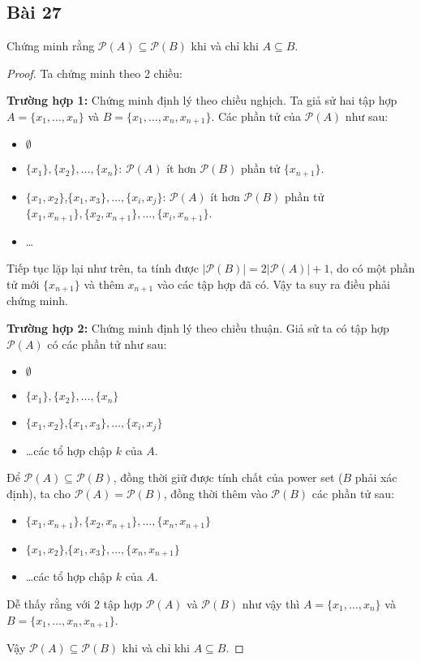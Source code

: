 \subsection*{Bài 27}
Chứng minh rằng $\mathcal{P}(A)\subseteq\mathcal{P}(B)$ khi và chỉ khi $A\subseteq B$.
\begin{proof}Ta chứng minh theo 2 chiều:\\
    \par\textbf{Trường hợp 1:} Chứng minh định lý theo chiều nghịch.
    Ta giả sử hai tập hợp $A=\{x_1,\dots,x_n\}$ và $B=\{x_1,\dots,x_n,x_{n+1}\}$.
    Các phần tử của $\mathcal{P}(A)$ như sau:
    \begin{itemize}
        \item $\emptyset$
        \item $\{x_1\},\{x_2\},\dots,\{x_n\}$: $\mathcal{P}(A)$ ít hơn $\mathcal{P}(B)$ phần tử $\{x_{n+1}\}$.
        \item $\{x_1,x_2\}$,$\{x_1,x_3\},\dots,\{x_i,x_j\}$: $\mathcal{P}(A)$ ít hơn $\mathcal{P}(B)$ phần tử\\ $\{x_1,x_{n+1}\},\{x_2,x_{n+1}\},\dots,\{x_i,x_{n+1}\}$.
        \item \dots
    \end{itemize}
    Tiếp tục lặp lại như trên, ta tính được $|\mathcal{P}(B)|=2|\mathcal{P}(A)|+1$, do có một phần tử mới $\{x_{n+1}\}$ và thêm $x_{n+1}$ vào các tập hợp đã có. Vậy ta suy ra điều phải chứng minh.
    \par\textbf{Trường hợp 2:} Chứng minh định lý theo chiều thuận.
    Giả sử ta có tập hợp $\mathcal{P}(A)$ có các phần tử như sau:
    \begin{itemize}
        \item $\emptyset$
        \item $\{x_1\},\{x_2\},\dots,\{x_n\}$
        \item $\{x_1,x_2\}$,$\{x_1,x_3\},\dots,\{x_i,x_j\}$
        \item \dots các tổ hợp chập $k$ của $A$.
    \end{itemize}
    Để $\mathcal{P}(A)\subseteq\mathcal{P}(B)$, đồng thời giữ được tính chất của power set ($B$ phải xác định), ta cho $\mathcal{P}(A)=\mathcal{P}(B)$, đồng thời thêm vào $\mathcal{P}(B)$ các phần tử sau:
    \begin{itemize}
        \item $\{x_1,x_{n+1}\},\{x_2,x_{n+1}\},\dots,\{x_n,x_{n+1}\}$
        \item $\{x_1,x_2\}$,$\{x_1,x_3\},\dots,\{x_n,x_{n+1}\}$
        \item \dots các tổ hợp chập $k$ của $A$.
    \end{itemize}
    Dễ thấy rằng với 2 tập hợp $\mathcal{P}(A)$ và $\mathcal{P}(B)$ như vậy thì $A=\{x_1,\dots,x_n\}$ và $B=\{x_1,\dots,x_n,x_{n+1}\}$.
    
    Vậy $\mathcal{P}(A)\subseteq\mathcal{P}(B)$ khi và chỉ khi $A\subseteq B$.
\end{proof}
